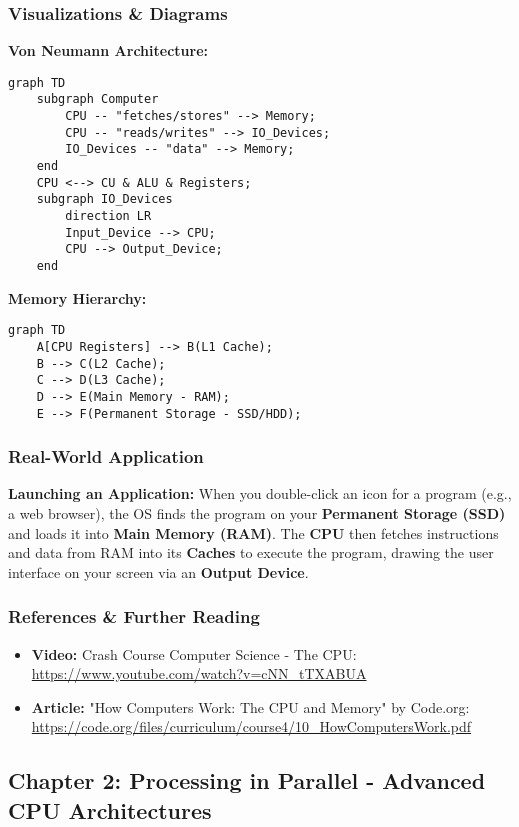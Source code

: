 \subsubsection{Visualizations \& Diagrams}
\textbf{Von Neumann Architecture:}
\begin{verbatim}
graph TD
    subgraph Computer
        CPU -- "fetches/stores" --> Memory;
        CPU -- "reads/writes" --> IO_Devices;
        IO_Devices -- "data" --> Memory;
    end
    CPU <--> CU & ALU & Registers;
    subgraph IO_Devices
        direction LR
        Input_Device --> CPU;
        CPU --> Output_Device;
    end
\end{verbatim}

\textbf{Memory Hierarchy:}
\begin{verbatim}
graph TD
    A[CPU Registers] --> B(L1 Cache);
    B --> C(L2 Cache);
    C --> D(L3 Cache);
    D --> E(Main Memory - RAM);
    E --> F(Permanent Storage - SSD/HDD);
\end{verbatim}

\subsubsection{Real-World Application}
\textbf{Launching an Application:} When you double-click an icon for a program (e.g., a web browser), the OS finds the program on your \textbf{Permanent Storage (SSD)} and loads it into \textbf{Main Memory (RAM)}. The \textbf{CPU} then fetches instructions and data from RAM into its \textbf{Caches} to execute the program, drawing the user interface on your screen via an \textbf{Output Device}.

\subsubsection{References \& Further Reading}
\begin{itemize}
    \item \textbf{Video:} Crash Course Computer Science - The CPU: \url{https://www.youtube.com/watch?v=cNN_tTXABUA}
    \item \textbf{Article:} "How Computers Work: The CPU and Memory" by Code.org: \url{https://code.org/files/curriculum/course4/10_HowComputersWork.pdf}
\end{itemize}

\subsection{Chapter 2: Processing in Parallel - Advanced CPU Architectures}
